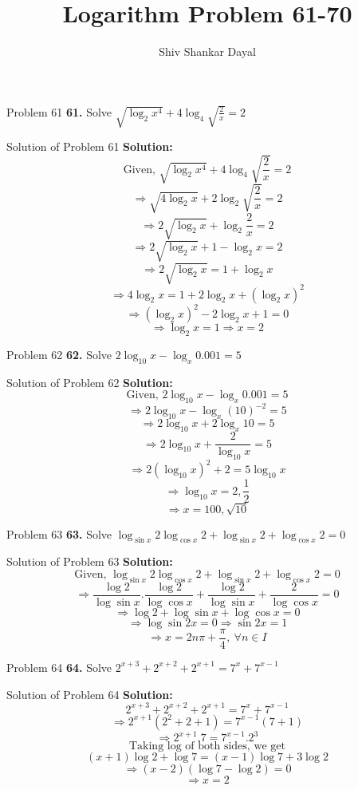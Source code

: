 \documentclass[aspectratio=1610,8pt]{beamer}
\title{Logarithm Problem 61-70}
\author[Shiv Shankar Dayal]{Shiv Shankar Dayal}
\begin{document}
\begin{frame}
  \titlepage
\end{frame}
\begin{frame}{Problem 61}
  \textbf{61.} Solve $\sqrt{\log_2x^4} + 4\log_4\sqrt{\frac{2}{x}} = 2$
\end{frame}
\begin{frame}{Solution of Problem 61}
  \textbf{Solution:} $$\text{Given,~}\sqrt{\log_2x^4} + 4\log_4\sqrt{\frac{2}{x}} = 2$$
  $$\Rightarrow \sqrt{4\log_2x} + 2\log_2\sqrt{\frac{2}{x}} = 2$$
  $$\Rightarrow 2\sqrt{\log_2x} + \log_2\frac{2}{x} = 2$$
  $$\Rightarrow 2\sqrt{\log_2x} + 1 - \log_2x = 2$$
  $$\Rightarrow 2\sqrt{\log_2x} = 1 + \log_2x$$
  $$\Rightarrow 4\log_2x = 1 + 2\log_2x + (\log_2x)^2$$
  $$\Rightarrow (\log_2x)^2 - 2\log_2x + 1 = 0$$
  $$\Rightarrow \log_2x = 1 \Rightarrow x = 2$$
\end{frame}
\begin{frame}{Problem 62}
  \textbf{62.} Solve $2\log_{10}x - \log_x0.001 = 5$
\end{frame}
\begin{frame}{Solution of Problem 62}
  \textbf{Solution:} $$\text{Given,~}2\log_{10}x - \log_x0.001 = 5$$
  $$\Rightarrow 2\log_{10}x - \log_x(10)^{-2} = 5$$
  $$\Rightarrow 2\log_{10}x + 2\log_x10 = 5$$
  $$\Rightarrow 2\log_{10}x + \frac{2}{\log_{10}x} = 5$$
  $$\Rightarrow 2(\log_{10}x)^2 + 2 = 5\log_{10}x$$
  $$\Rightarrow \log_{10}x = 2, \frac{1}{2}$$
  $$\Rightarrow x = 100, \sqrt{10}$$
\end{frame}
\begin{frame}{Problem 63}
  \textbf{63.} Solve $\log_{\sin x}2\log_{\cos x}2 + \log_{\sin x}2 + \log_{\cos x}2 = 0$
\end{frame}
\begin{frame}{Solution of Problem 63}
  \textbf{Solution:} $$\text{Given,~}\log_{\sin x}2\log_{\cos x}2 + \log_{\sin x}2 + \log_{\cos x}2 = 0$$
  $$\Rightarrow \frac{\log 2}{\log \sin x}.\frac{\log 2}{\log \cos x} + \frac{\log 2}{\log \sin x} + \frac{2}{\log \cos x} = 0$$
  $$\Rightarrow \log 2 + \log \sin x + \log \cos x = 0$$
  $$\Rightarrow \log \sin2x = 0\Rightarrow \sin 2x = 1$$
  $$\Rightarrow x = 2n\pi + \frac{\pi}{4},~\forall n\in I$$
\end{frame}
\begin{frame}{Problem 64}
  \textbf{64.} Solve $2^{x + 3} + 2^{x + 2} + 2^{x + 1} = 7^{x} + 7^{x - 1}$
\end{frame}
\begin{frame}{Solution of Problem 64}
  \textbf{Solution:} $$2^{x + 3} + 2^{x + 2} + 2^{x + 1} = 7^{x} + 7^{x - 1}$$
  $$\Rightarrow 2^{x + 1}(2^2 + 2 + 1) = 7^{x -1}(7 + 1)$$
  $$\Rightarrow 2^{x+1}.7 = 7^{x-1}.2^3$$
  $$\text{Taking~}\log\text{~of both sides, we get}$$
  $$(x + 1)\log 2 + \log 7 = (x - 1)\log 7 + 3\log 2$$
  $$\Rightarrow (x - 2)(\log 7 - \log 2) = 0$$
  $$\Rightarrow x = 2$$
\end{frame}
\end{document}
